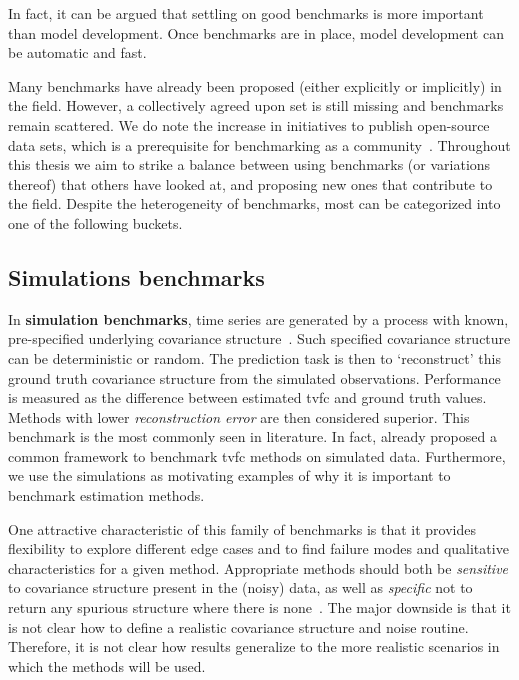 In fact, it can be argued that settling on good benchmarks is more important than model development.
Once benchmarks are in place, model development can be automatic and fast.

Many benchmarks have already been proposed (either explicitly or implicitly) in the field.
However, a collectively agreed upon set is still missing and benchmarks remain scattered.
We do note the increase in initiatives to publish open-source data sets, which is a prerequisite for benchmarking as a community~\parencite{Gorgolewski2016, Kennedy2016, Nichols2017, Leenings2022}.
Throughout this thesis we aim to strike a balance between using benchmarks (or variations thereof) that others have looked at, and proposing new ones that contribute to the field.
Despite the heterogeneity of benchmarks, most can be categorized into one of the following buckets.

\subsection{Simulations benchmarks}
\label{subsec:simulation-benchmarks}

In \textbf{simulation benchmarks}, time series are generated by a process with known, pre-specified underlying covariance structure~\parencite[see e.g.][]{Sakoglu2010, Lindquist2014, Hindriks2016, Shakil2016, Lan2017, Monti2017, Taghia2017, Thompson2018, Warnick2018, Li2019b, Ebrahimi2020}.
Such specified covariance structure can be deterministic or random.
%
The prediction task is then to `reconstruct' this ground truth covariance structure from the simulated observations.
Performance is measured as the difference between estimated \gls{tvfc} and ground truth values.
Methods with lower \emph{reconstruction error} are then considered superior.
%
This benchmark is the most commonly seen in literature.
In fact, \textcite{Thompson2018} already proposed a common framework to benchmark \gls{tvfc} methods on simulated data.
%
Furthermore, we use the simulations as motivating examples of why it is important to benchmark estimation methods.

One attractive characteristic of this family of benchmarks is that it provides flexibility to explore different edge cases and to find failure modes and qualitative characteristics for a given method.
Appropriate methods should both be \emph{sensitive} to covariance structure present in the (noisy) data, as well as \emph{specific} not to return any spurious structure where there is none~\parencite{Leonardi2015}.
%
The major downside is that it is not clear how to define a realistic covariance structure and noise routine.
Therefore, it is not clear how results generalize to the more realistic scenarios in which the methods will be used.


